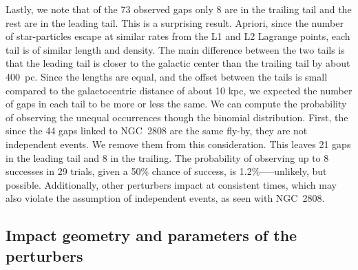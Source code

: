 \documentclass{aa}
\begin{document}
    Lastly, we note that of the 73 observed gaps only 8 are in the trailing tail and the rest are in the leading tail. This is a surprising result. Apriori, since the number of star-particles escape at similar rates from the L1 and L2 Lagrange points, each tail is of similar length and density. The main difference between the two tails is that the leading tail is closer to the galactic center than the trailing tail by about 400~pc. Since the lengths are equal, and the offset between the tails is small compared to the galactocentric distance of about 10 kpc, we expected the number of gaps in each tail to be more or less the same. We can compute the probability of observing the unequal occurrences though the binomial distribution. First, the since the 44 gaps linked to NGC~2808 are the same fly-by, they are not independent events. We remove them from this consideration. This leaves 21 gaps in the leading tail and 8 in the trailing. The probability of observing up to 8 successes in 29 trials, given a 50\% chance of success, is 1.2\%--—unlikely, but possible. Additionally, other perturbers impact at consistent times, which may also violate the assumption of independent events, as seen with NGC~2808.


   
  \subsection{Impact geometry and parameters of the perturbers}\label{sect:geometry}
  
\end{document}
